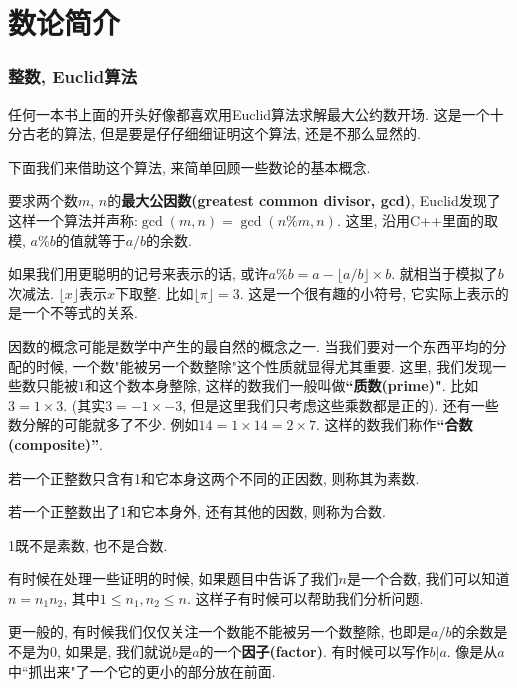 \part{数论简介}

\section{整数, Euclid算法}

任何一本书上面的开头好像都喜欢用Euclid算法求解最大公约数开场. 
这是一个十分古老的算法, 但是要是仔仔细细证明这个算法, 还是不那么显然的. 

下面我们来借助这个算法, 来简单回顾一些数论的基本概念. 

要求两个数$m$, $n$的\textbf{最大公因数(greatest common divisor, gcd)}, 
Euclid发现了这样一个算法并声称:$\gcd(m, n) = \gcd(n\%m, n)$. 
这里, 沿用C++里面的取模, $a\%b$的值就等于$a/ b$的余数. 

如果我们用更聪明的记号来表示的话, 或许$a\%b=a-\lfloor a/b\rfloor\times b$. 
就相当于模拟了$b$次减法. $\lfloor x\rfloor$表示$x$下取整. 比如$\lfloor \pi\rfloor=3$. 
这是一个很有趣的小符号, 它实际上表示的是一个不等式的关系. 

因数的概念可能是数学中产生的最自然的概念之一. 
当我们要对一个东西平均的分配的时候, 一个数"能被另一个数整除"这个性质就显得尤其重要. 
 这里, 我们发现一些数只能被$1$和这个数本身整除, 
这样的数我们一般叫做\textbf{``质数(prime)"}. 比如$3=1\times3$. 
(其实$3=-1\times -3$, 但是这里我们只考虑这些乘数都是正的). 
还有一些数分解的可能就多了不少. 例如$14=1\times 14 = 2\times 7$. 
这样的数我们称作\textbf{``合数(composite)''}.

\begin{definition}[质数与合数]
    若一个正整数只含有1和它本身这两个不同的正因数, 则称其为素数. 

    若一个正整数出了1和它本身外, 还有其他的因数, 则称为合数.

    1既不是素数, 也不是合数. 
\end{definition}

有时候在处理一些证明的时候, 如果题目中告诉了我们$n$是一个合数, 我们可以知道$n=n_1n_2$, 
其中$1\leq n_1, n_2\leq n$. 这样子有时候可以帮助我们分析问题. 



更一般的, 有时候我们仅仅关注一个数能不能被另一个数整除,
也即是$a/ b$的余数是不是为0, 如果是, 
我们就说$b$是$a$的一个\textbf{因子(factor)}. 
有时候可以写作$b|a$. 像是从$a$中``抓出来"了一个它的更小的部分放在前面. 


